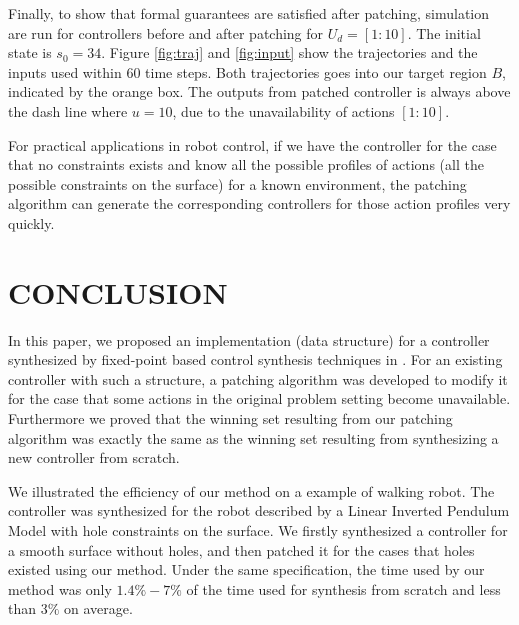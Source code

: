 Finally, to show that formal guarantees are satisfied after patching, simulation are run for controllers before and after patching for $ U_d =[1:10]$. The initial state is $ s_0=34 $. Figure \ref{fig:traj} and \ref{fig:input} show the trajectories and the inputs used within $ 60 $ time steps. Both trajectories goes into our target region $ B $, indicated by the orange box. The outputs from patched controller is always above the dash line where $ u=10 $, due to the unavailability of actions $[1:10] $.

For practical applications in robot control, if we have the controller for the case that no constraints exists and know all the possible profiles of actions (all the possible constraints on the surface) for a known environment, the patching algorithm can generate the corresponding controllers for those action profiles very quickly. 

\section{CONCLUSION}
In this paper, we proposed an implementation (data structure) for a controller synthesized by fixed-point based control synthesis techniques in \cite{Nilsson2017}. For an existing controller with such a structure, a patching algorithm was developed to modify it for the case that some actions in the original problem setting become unavailable. Furthermore we proved that the winning set resulting from our patching algorithm was exactly the same as the winning set resulting from synthesizing a new controller from scratch. 

We illustrated the efficiency of our method on a example of walking robot. The controller was synthesized for the robot described by a Linear Inverted Pendulum Model with hole constraints on the surface. We firstly synthesized a controller for a smooth surface without holes, and then patched it for the cases that holes existed using our method. Under the same specification, the time used by our method was only $ 1.4\%-7\% $ of the time used for synthesis from scratch and less than $ 3\% $ on average. 


